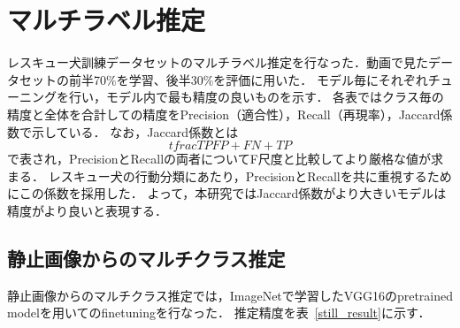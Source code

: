 \section{マルチラベル推定}
レスキュー犬訓練データセットのマルチラベル推定を行なった．動画で見たデータセットの前半70\%を学習、後半30\%を評価に用いた．
モデル毎にそれぞれチューニングを行い，モデル内で最も精度の良いものを示す．
各表ではクラス毎の精度と全体を合計しての精度をPrecision（適合性），Recall（再現率），Jaccard係数で示している．
なお，Jaccard係数とは\[tfrac{TP}{FP+FN+TP}\]で表され，PrecisionとRecallの両者についてF尺度と比較してより厳格な値が求まる．
レスキュー犬の行動分類にあたり，PrecisionとRecallを共に重視するためにこの係数を採用した．
よって，本研究ではJaccard係数がより大きいモデルは精度がより良いと表現する．

\subsection{静止画像からのマルチクラス推定}
静止画像からのマルチクラス推定では，ImageNetで学習したVGG16のpretrained modelを用いてのfinetuningを行なった．
推定精度を表~\ref{still_result}に示す．

